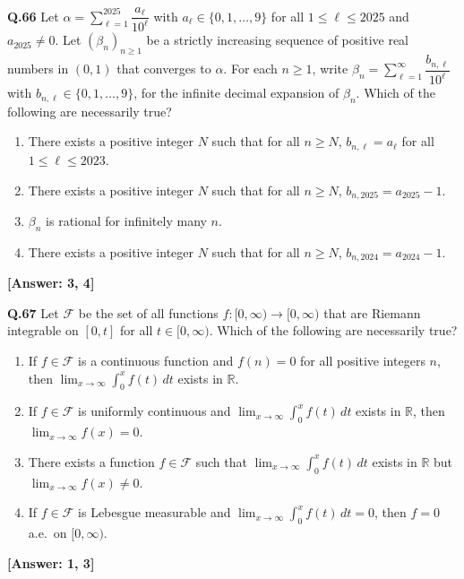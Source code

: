 \documentclass[12pt,a4paper]{article}
\newcommand{\ans}[1]{\quad\textcolor{anscolor}{\textbf{[Answer: #1]}}}
\begin{document}
\textbf{Q.66} Let $\alpha=\displaystyle\sum_{\ell=1}^{2025}\dfrac{a_\ell}{10^\ell}$ with $a_\ell\in\{0,1,\ldots,9\}$ for all $1\le\ell\le2025$ and $a_{2025}\neq0$. Let $(\beta_n)_{n\ge1}$ be a strictly increasing sequence of positive real numbers in $(0,1)$ that converges to $\alpha$. For each $n\ge1$, write $\beta_n=\displaystyle\sum_{\ell=1}^\infty\dfrac{b_{n,\ell}}{10^\ell}$ with $b_{n,\ell}\in\{0,1,\ldots,9\}$, for the infinite decimal expansion of $\beta_n$. Which of the following are necessarily true?
\begin{enumerate}[label=\arabic*.]
\item There exists a positive integer $N$ such that for all $n\ge N$, $b_{n,\ell}=a_\ell$ for all $1\le\ell\le2023$.
\item There exists a positive integer $N$ such that for all $n\ge N$, $b_{n,2025}=a_{2025}-1$.
\item $\beta_n$ is rational for infinitely many $n$.
\item There exists a positive integer $N$ such that for all $n\ge N$, $b_{n,2024}=a_{2024}-1$.
\end{enumerate}\ans{3, 4}

\textbf{Q.67} Let $\mathcal{F}$ be the set of all functions $f:[0,\infty)\to[0,\infty)$ that are Riemann integrable on $[0,t]$ for all $t\in[0,\infty)$. Which of the following are necessarily true?
\begin{enumerate}[label=\arabic*.]
\item If $f\in\mathcal{F}$ is a continuous function and $f(n)=0$ for all positive integers $n$, then $\lim_{x\to\infty}\int_0^xf(t)\,dt$ exists in $\mathbb{R}$.
\item If $f\in\mathcal{F}$ is uniformly continuous and $\lim_{x\to\infty}\int_0^xf(t)\,dt$ exists in $\mathbb{R}$, then $\lim_{x\to\infty}f(x)=0$.
\item There exists a function $f\in\mathcal{F}$ such that $\lim_{x\to\infty}\int_0^xf(t)\,dt$ exists in $\mathbb{R}$ but $\lim_{x\to\infty}f(x)\neq0$.
\item If $f\in\mathcal{F}$ is Lebesgue measurable and $\lim_{x\to\infty}\int_0^xf(t)\,dt=0$, then $f=0$ a.e.\ on $[0,\infty)$.
\end{enumerate}\ans{1, 3}
\end{document}
